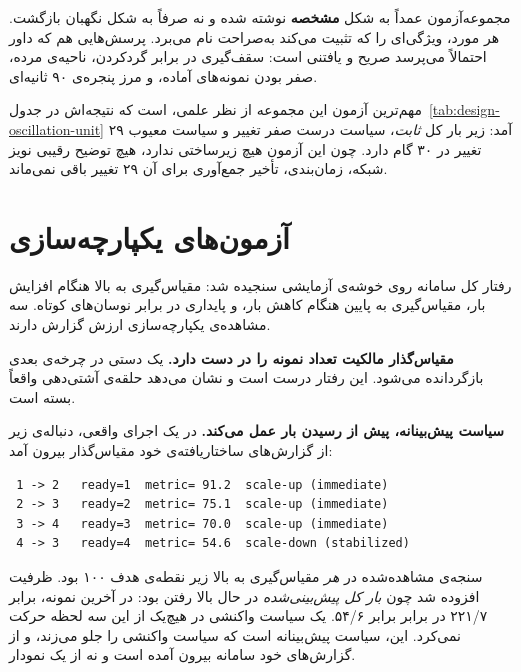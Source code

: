 مجموعه‌آزمون عمداً به شکل \textbf{مشخصه} نوشته شده و نه صرفاً به شکل نگهبان بازگشت. هر مورد،
ویژگی‌ای را که تثبیت می‌کند به‌صراحت نام می‌برد. پرسش‌هایی هم که داور احتمالاً می‌پرسد صریح و
یافتنی است: سقف‌گیری در برابر گردکردن، ناحیه‌ی مرده، صفر بودن نمونه‌های آماده، و مرز پنجره‌ی
۹۰ ثانیه‌ای.

مهم‌ترین آزمون این مجموعه از نظر علمی، 
است که نتیجه‌اش در جدول~\ref{tab:design-oscillation-unit} آمد: زیر بار کل \emph{ثابت}، سیاست
درست صفر تغییر و سیاست معیوب ۲۹ تغییر در ۳۰ گام دارد. چون این آزمون هیچ زیرساختی ندارد، هیچ
توضیح رقیبی \mdash{} نویز شبکه، زمان‌بندی، تأخیر جمع‌آوری \mdash{} برای آن ۲۹ تغییر باقی نمی‌ماند.

\section{آزمون‌های یکپارچه‌سازی}
\label{sec:results-integration}

رفتار کل سامانه روی خوشه‌ی آزمایشی سنجیده شد: مقیاس‌گیری به بالا هنگام افزایش بار،
مقیاس‌گیری به پایین هنگام کاهش بار، و پایداری در برابر نوسان‌های کوتاه. سه مشاهده‌ی
یکپارچه‌سازی ارزش گزارش دارند.

\textbf{مقیاس‌گذار مالکیت تعداد نمونه را در دست دارد.} یک  دستی در چرخه‌ی
بعدی بازگردانده می‌شود. این رفتار درست است و نشان می‌دهد حلقه‌ی آشتی‌دهی واقعاً بسته است.

\textbf{سیاست پیش‌بینانه، پیش از رسیدن بار عمل می‌کند.} در یک اجرای واقعی، دنباله‌ی زیر از
گزارش‌های ساختاریافته‌ی خود مقیاس‌گذار بیرون آمد:

\begin{latin}
\begin{lstlisting}
 1 -> 2   ready=1  metric= 91.2  scale-up (immediate)
 2 -> 3   ready=2  metric= 75.1  scale-up (immediate)
 3 -> 4   ready=3  metric= 70.0  scale-up (immediate)
 4 -> 3   ready=4  metric= 54.6  scale-down (stabilized)
\end{lstlisting}
\end{latin}

سنجه‌ی مشاهده‌شده در \emph{هر} مقیاس‌گیری به بالا زیر نقطه‌ی هدف ۱۰۰ بود. ظرفیت افزوده شد چون
\emph{بار کل پیش‌بینی‌شده} در حال بالا رفتن بود: در آخرین نمونه،
 برابر ۲۲۱/۷ در برابر 
برابر ۵۴/۶. یک سیاست واکنشی در هیچ‌یک از این سه لحظه حرکت نمی‌کرد. این، سیاست پیش‌بینانه است
که سیاست واکنشی را جلو می‌زند، و از گزارش‌های خود سامانه بیرون آمده است و نه از یک نمودار.

